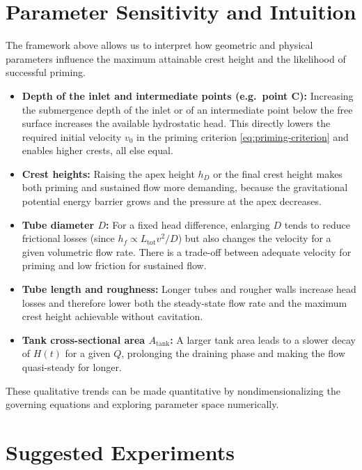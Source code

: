 \documentclass[11pt]{article}
\begin{document}
\section{Parameter Sensitivity and Intuition}
\label{sec:parameters}

The framework above allows us to interpret how geometric and physical parameters influence the maximum attainable crest height and the likelihood of successful priming.

\begin{itemize}
  \item \textbf{Depth of the inlet and intermediate points (e.g.\ point C):}
  Increasing the submergence depth of the inlet or of an intermediate point below the free surface increases the available hydrostatic head.
  This directly lowers the required initial velocity $v_0$ in the priming criterion \eqref{eq:priming-criterion} and enables higher crests, all else equal.

  \item \textbf{Crest heights:}
  Raising the apex height $h_D$ or the final crest height makes both priming and sustained flow more demanding, because the gravitational potential energy barrier grows and the pressure at the apex decreases.

  \item \textbf{Tube diameter $D$:}
  For a fixed head difference, enlarging $D$ tends to reduce frictional losses (since $h_f \propto L_{\text{tot}} v^2 / D$) but also changes the velocity for a given volumetric flow rate.
  There is a trade-off between adequate velocity for priming and low friction for sustained flow.

  \item \textbf{Tube length and roughness:}
  Longer tubes and rougher walls increase head losses and therefore lower both the steady-state flow rate and the maximum crest height achievable without cavitation.

  \item \textbf{Tank cross-sectional area $A_{\text{tank}}$:}
  A larger tank area leads to a slower decay of $H(t)$ for a given $Q$, prolonging the draining phase and making the flow quasi-steady for longer.
\end{itemize}

These qualitative trends can be made quantitative by nondimensionalizing the governing equations and exploring parameter space numerically.

\section{Suggested Experiments}
\label{sec:experiments}
\end{document}
